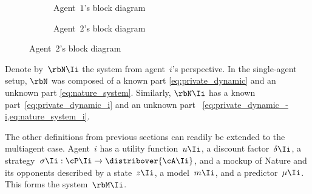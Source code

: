 \begin{sidewaysfigure}
\centering
{}
\label{fig:agent_knowledge_two-agent}
\end{sidewaysfigure}

\begin{figure}[htp]
\centering
{}
\label{fig:block_diagram_two-agent_problem}
\end{figure}

\begin{figure}[htp]
\begin{subfigure}[b]{0.5\textwidth}
\centering
{
  \renewcommand{\agparameter}{1}
}
\caption{Agent~\(1\)'s block diagram}
\end{subfigure}%
\begin{subfigure}[b]{0.5\textwidth}
\centering
{
  \renewcommand{\agparameter}{2}
}
\caption{Agent~\(2\)'s block diagram}
\end{subfigure}%
\label{fig:block_diagram_two-agent_problem_with_full_mockup_and_strategy}
\end{figure}

Denote by~\(\rbN\Ii\) the system from agent~\(i\)'s perspective.
In the single-agent setup, \(\rbN\) was composed of a known part \cref{eq:private_dynamic} and an unknown part \cref{eq:nature_system}.
Similarly, \(\rbN\Ii\) has a known part~\cref{eq:private_dynamic_i} and an unknown part~ \cref{eq:private_dynamic_-i,eq:nature_system_i}.

The other definitions from previous sections can readily be extended to the multiagent case.
Agent~\(i\) has a utility function~\(u\Ii\), a discount factor~\(\delta\Ii\), a strategy~\(\sigma\Ii : \cP\Ii \to \distribover{\cA\Ii}\), and a mockup of Nature and its opponents described by a state~\(z\Ii\), a model~\(m\Ii\), and a predictor~\(\mu\Ii\).
This forms the system~\(\rbM\Ii\).

